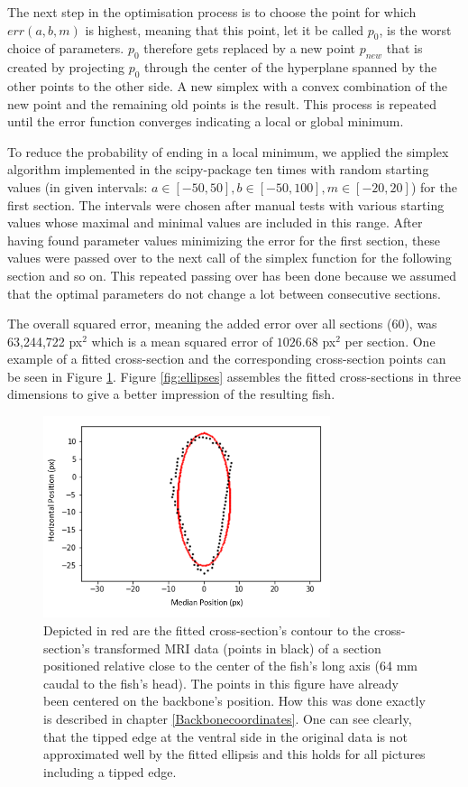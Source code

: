 The next step in the optimisation process is to choose the point for which $err(a,b,m)$ is highest, meaning that this point, let it be called $p_0$, is the worst choice of parameters. $p_0$ therefore gets replaced by a new point $p_{new}$ that is created by projecting $p_0$ through the center of the hyperplane spanned by the other points to the other side. A new simplex with a convex combination of the new point and the remaining old points is the result. This process is repeated until the error function converges indicating a local or global minimum. 

To reduce the probability of ending in a local minimum, we applied the simplex algorithm implemented in the scipy-package \cite{2020SciPy-NMeth} ten times with random starting values (in given intervals: $a \in [-50,50], b\in [-50,100], m \in [-20,20]$) for the first section. The intervals were chosen after manual tests with various starting values whose maximal and minimal values are included in this range. After having found parameter values minimizing the error for the first section, these values were passed over to the next call of the simplex function for the following section and so on. This repeated passing over has been done because we assumed that the optimal parameters do not change a lot between consecutive sections. 

The overall squared error, meaning the added error over all sections (60), was 63,244,722 px$^2$ which is a mean squared error of $1026.68$ px$^2$ per section. One example of a fitted cross-section and the corresponding cross-section points can be seen in Figure \ref{fig:fitted_ellipsis}. Figure \ref{fig:ellipses} assembles the fitted cross-sections in three dimensions to give a better impression of the resulting fish.

\begin{figure}
    \centering
    \includegraphics[width = 0.75\textwidth]{figures/FittedEllipsis_64.png}
    \caption{Depicted in red are the fitted cross-section's contour to the cross-section's transformed MRI data (points in black) of a section positioned relative close to the center of the fish's long axis (64 mm caudal to the fish's head). The points in this figure have already been centered on the backbone's position. How this was done exactly is described in chapter \ref{Backbonecoordinates}. One can see clearly, that the tipped edge at the ventral side in the original data is not approximated well by the fitted ellipsis and this holds for all pictures including a tipped edge. }
    \label{fig:fitted_ellipsis}
\end{figure}

